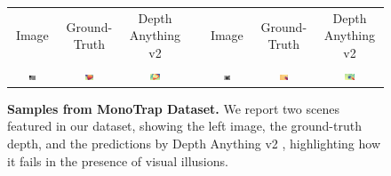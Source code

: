 \documentclass[10pt,twocolumn,letterpaper]{article}
\newcommand{\dataset}[0]{MonoTrap\xspace}
\begin{document}
\begin{figure}[t]
    \centering
    \renewcommand{\tabcolsep}{1pt}
    \hspace*{-0.5cm}\begin{tabular}{ccccccc}
    \small Image
    & \small Ground-Truth
    & \small Depth Anything v2 \cite{depth_anything_v2} &
    & \small Image
    & \small Ground-Truth
    & \small Depth Anything v2 \cite{depth_anything_v2} \\

    \includegraphics[width=0.16\textwidth]{imgs/monotrap_samples/rgb/13.jpg}
    &\includegraphics[width=0.16\textwidth]{imgs/monotrap_samples/gt/13.jpg}
    &\includegraphics[width=0.16\textwidth]{imgs/monotrap_samples/mono/13.jpg}
    & \hspace{0.1cm} &

    \includegraphics[width=0.16\textwidth]{imgs/monotrap_samples/rgb/2.jpg}
    &\includegraphics[width=0.16\textwidth]{imgs/monotrap_samples/gt/2.jpg}
    &\includegraphics[width=0.16\textwidth]{imgs/monotrap_samples/mono/2.jpg}
    \\
    \end{tabular}\vspace{-0.2cm}
    \caption{\textbf{Samples from \dataset Dataset.} We report two scenes featured in our dataset, showing the left image, the ground-truth depth, and the predictions by Depth Anything v2 \cite{depth_anything_v2}, highlighting how it fails in the presence of visual illusions.}\vspace{-0.3cm}
    \label{fig:monotrap}
\end{figure}
\end{document}
